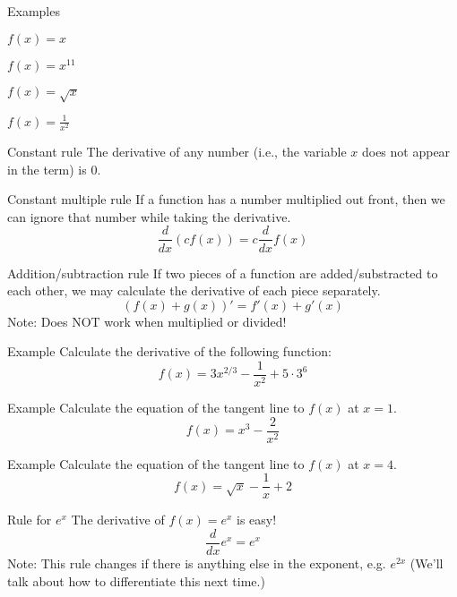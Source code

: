 \documentclass[t]{beamer}
\newenvironment{fpi}
  {\itemize[nolistsep,itemsep=\fill]}
  {\vfill\enditemize}
\begin{document}
\begin{frame}{Examples}
\begin{fpi}
\item $\displaystyle f(x) = x$
\item $\displaystyle f(x) = x^{11}$
\item $\displaystyle f(x) = \sqrt{x}$
\item $\displaystyle f(x) = \frac{1}{x^2}$
\end{fpi}
\end{frame}

\begin{frame}{Constant rule}
The derivative of any number (i.e., the variable $x$ does not appear in the term) is $0$.
\end{frame}

\begin{frame}{Constant multiple rule}
If a function has a number multiplied out front, then we can ignore
that number while taking the derivative.
$$\frac{d}{dx}(c f(x)) = c \frac{d}{dx}f(x)$$
\end{frame}

\begin{frame}{Addition/subtraction rule}
If two pieces of a function are added/substracted to each other, we may
calculate the derivative of each piece separately.
$$(f(x) + g(x))' = f'(x) + g'(x)$$
Note: Does NOT work when multiplied or divided!
\end{frame}

\begin{frame}{Example}
Calculate the derivative of the following function:
$$f(x) = 3x^{2/3} - \frac{1}{x^2} + 5\cdot 3^6$$
\end{frame}

\begin{frame}{Example}
Calculate the equation of the tangent line to $f(x)$ at $x = 1$.
$$f(x) = x^3 - \frac{2}{x^2}$$
\end{frame}

\begin{frame}{Example}
Calculate the equation of the tangent line to $f(x)$ at $x = 4$.
$$f(x) = \sqrt{x} - \frac{1}{x} + 2$$
\end{frame}

\begin{frame}{Rule for $e^x$}
The derivative of $f(x) = e^x$ is easy!
$$\frac{d}{dx} e^x = e^x$$
Note: This rule changes if there is anything else in the exponent,
e.g. $e^{2x}$  (We'll talk about how to differentiate this next time.)
\end{frame}
\end{document}
